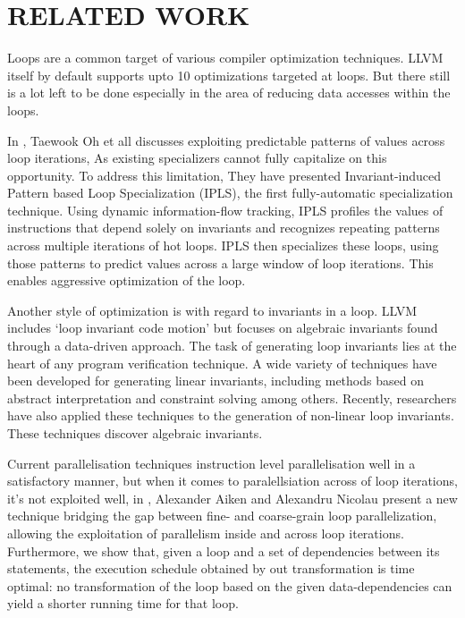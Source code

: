 \chapter{RELATED WORK} %
Loops are a common target of various compiler optimization techniques. LLVM itself by default supports upto 10 optimizations targeted at loops. But there still is a lot left to be done especially in the area of reducing data accesses within the loops.

In \cite{oh2013practical}, Taewook Oh et all discusses exploiting predictable patterns of values across loop iterations, As existing specializers cannot fully capitalize on this opportunity. To address this limitation, They have presented Invariant-induced Pattern based Loop Specialization (IPLS), the first fully-automatic specialization technique. Using dynamic information-flow tracking, IPLS profiles the values of instructions that depend solely on invariants and recognizes repeating patterns across multiple iterations of hot loops. IPLS then specializes these loops, using those patterns to predict values across a large window of loop iterations. This enables aggressive optimization of the loop.

Another style of optimization is with regard to invariants in a loop. LLVM includes ‘loop invariant code motion’ but \cite{sharma2013data} focuses on algebraic invariants found through a data-driven approach. The task of generating loop invariants lies at the heart of any program verification technique. A wide variety of techniques have been developed for generating linear invariants, including methods based on abstract interpretation and constraint solving among others. Recently, researchers have also applied these techniques to the generation of non-linear loop invariants. These techniques discover algebraic invariants.


Current parallelisation techniques instruction level parallelisation well in a satisfactory manner, but when it comes to paralellsiation across of loop iterations, it’s not exploited well, in \cite{aiken1988optimal}, Alexander Aiken and Alexandru Nicolau  present a new technique bridging the gap between fine- and coarse-grain loop parallelization, allowing the exploitation of parallelism inside and across loop iterations. Furthermore, we show that, given a loop and a set of dependencies between its statements, the execution schedule obtained by out transformation is time optimal: no transformation of the loop based on the given data-dependencies can yield a shorter running time for that loop.


